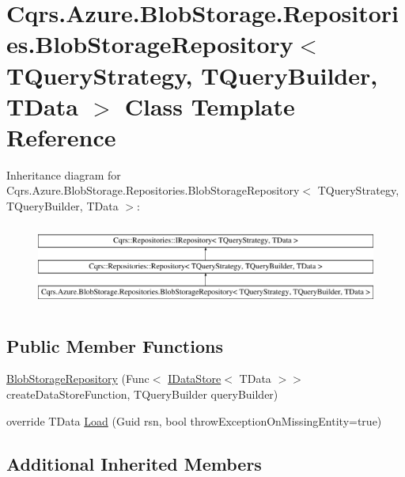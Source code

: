 \hypertarget{classCqrs_1_1Azure_1_1BlobStorage_1_1Repositories_1_1BlobStorageRepository}{}\section{Cqrs.\+Azure.\+Blob\+Storage.\+Repositories.\+Blob\+Storage\+Repository$<$ T\+Query\+Strategy, T\+Query\+Builder, T\+Data $>$ Class Template Reference}
\label{classCqrs_1_1Azure_1_1BlobStorage_1_1Repositories_1_1BlobStorageRepository}
Inheritance diagram for Cqrs.\+Azure.\+Blob\+Storage.\+Repositories.\+Blob\+Storage\+Repository$<$ T\+Query\+Strategy, T\+Query\+Builder, T\+Data $>$\+:\begin{figure}[H]
\begin{center}
\leavevmode
\includegraphics[height=2.749591cm]{classCqrs_1_1Azure_1_1BlobStorage_1_1Repositories_1_1BlobStorageRepository}
\end{center}
\end{figure}
\subsection*{Public Member Functions}
\begin{DoxyCompactItemize}
\item 
\hyperlink{classCqrs_1_1Azure_1_1BlobStorage_1_1Repositories_1_1BlobStorageRepository_a11ec03d2f22e21b2a84556fd26077909}{Blob\+Storage\+Repository} (Func$<$ \hyperlink{interfaceCqrs_1_1DataStores_1_1IDataStore}{I\+Data\+Store}$<$ T\+Data $>$$>$ create\+Data\+Store\+Function, T\+Query\+Builder query\+Builder)
\item 
override T\+Data \hyperlink{classCqrs_1_1Azure_1_1BlobStorage_1_1Repositories_1_1BlobStorageRepository_a7c5a3ca4d92cf4954508fb3e583eb49e}{Load} (Guid rsn, bool throw\+Exception\+On\+Missing\+Entity=true)
\end{DoxyCompactItemize}
\subsection*{Additional Inherited Members}


